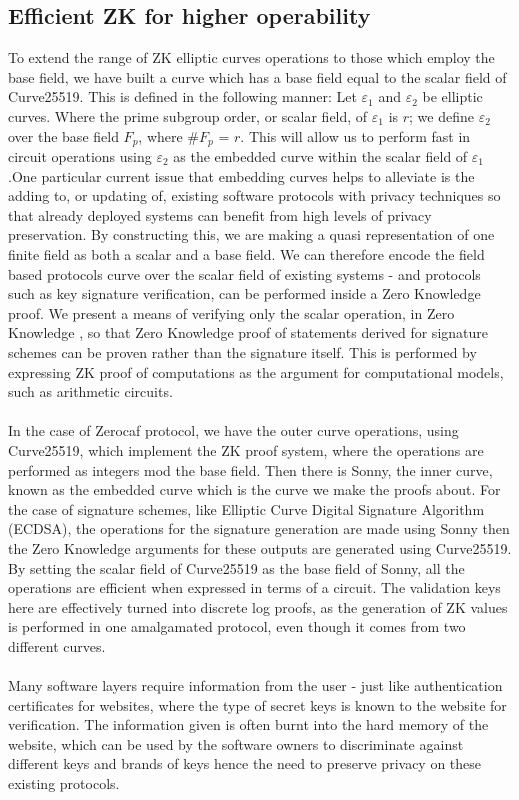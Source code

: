 \documentclass{article}
\begin{document}
\subsection{Efficient ZK for higher operability }
To extend the range of ZK elliptic curves operations to those which employ the base field, we have built a curve which has a base field equal to the scalar field of Curve25519. This is defined in the following manner: Let $\varepsilon_{1}$ and $\varepsilon_{2}$ be elliptic curves. Where the prime subgroup order, or scalar field, of $\varepsilon_{1}$ is $r$; we define $\varepsilon_{2}$ over the base field $F_p$, where \#$F_p$ = $r$. 
This will allow us to perform fast in circuit operations using $\varepsilon_{2}$ as the embedded curve within the scalar field of $\varepsilon_{1}$.One particular current issue that embedding curves helps to alleviate is the adding to, or updating of, existing software protocols with privacy techniques so that already deployed systems can benefit from high levels of privacy preservation. By constructing this, we are making a quasi representation of one finite field as both a scalar and a base field. We can therefore encode the field based protocols curve over the scalar field of existing systems - and protocols such as key signature verification, can be performed inside a Zero Knowledge  proof. We present a means of verifying only the scalar operation, in Zero Knowledge , so that Zero Knowledge  proof of statements derived for signature schemes can be proven rather than the signature itself. This is performed by expressing ZK proof of computations as the argument for computational models, such as arithmetic circuits.\\\\
In the case of Zerocaf protocol, we have the outer curve operations, using Curve25519, which implement the ZK proof system, where the operations are performed as integers mod the base field. Then there is Sonny, the inner curve, known as the embedded curve which is the curve we make the proofs about. For the case of signature schemes, like Elliptic Curve Digital Signature Algorithm (ECDSA), the operations for the signature generation are made using Sonny then the Zero Knowledge  arguments for these outputs are generated using Curve25519. By setting the scalar field of Curve25519 as the base field of Sonny, all the operations are efficient when expressed in terms of a circuit. The validation keys here are effectively turned into discrete log proofs, as the generation of ZK values is performed in one amalgamated protocol, even though it comes from two different curves. \\\\
Many software layers require information from the user - just like authentication certificates for websites, where the type of secret keys is known to the website for verification. The information given is often burnt into the hard memory of the website, which can be used by the software owners to discriminate against different keys and brands of keys hence the need to preserve privacy on these existing protocols.
\end{document}
